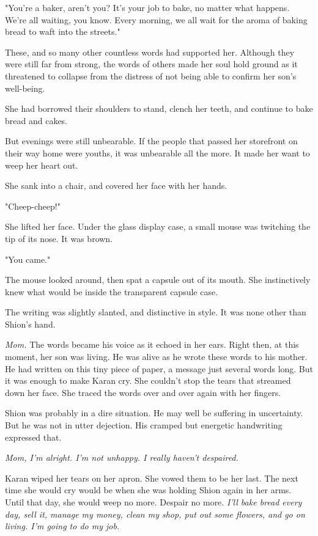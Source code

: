 "You're a baker, aren't you? It's your job to bake, no matter what
happens. We're all waiting, you know. Every morning, we all wait for the
aroma of baking bread to waft into the streets."

These, and so many other countless words had supported her. Although
they were still far from strong, the words of others made her soul hold
ground as it threatened to collapse from the distress of not being able
to confirm her son's well-being.

She had borrowed their shoulders to stand, clench her teeth, and
continue to bake bread and cakes.

But evenings were still unbearable. If the people that passed her
storefront on their way home were youths, it was unbearable all the
more. It made her want to weep her heart out.

She sank into a chair, and covered her face with her hands.

"Cheep-cheep!"

She lifted her face. Under the glass display case, a small mouse was
twitching the tip of its nose. It was brown.

"You came."

The mouse looked around, then spat a capsule out of its mouth. She
instinctively knew what would be inside the transparent capsule case.


The writing was slightly slanted, and distinctive in style. It was none
other than Shion's hand.

\emph{Mom.} The words became his voice as it echoed in her ears. Right then, at
this moment, her son was living. He was alive as he wrote these words to
his mother. He had written on this tiny piece of paper, a message just
several words long. But it was enough to make Karan cry. She couldn't
stop the tears that streamed down her face. She traced the words over
and over again with her fingers.

Shion was probably in a dire situation. He may well be suffering in
uncertainty. But he was not in utter dejection. His cramped but
energetic handwriting expressed that.

\emph{Mom, I'm alright. I'm not unhappy. I really haven't despaired.}

Karan wiped her tears on her apron. She vowed them to be her last. The
next time she would cry would be when she was holding Shion again in her
arms. Until that day, she would weep no more. Despair no more. \emph{I'll bake
bread every day, sell it, manage my money, clean my shop, put out some
flowers, and go on living. I'm going to do my job.}

